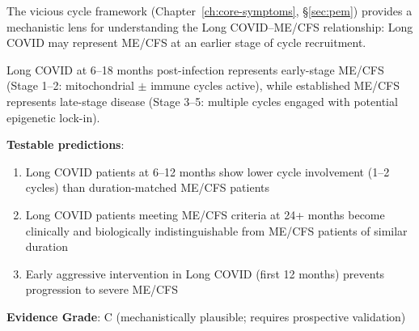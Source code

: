 The vicious cycle framework (Chapter~\ref{ch:core-symptoms}, \S\ref{sec:pem}) provides a mechanistic lens for understanding the Long COVID--ME/CFS relationship: Long COVID may represent ME/CFS at an earlier stage of cycle recruitment.

\begin{hypothesis}
Long COVID at 6--18 months post-infection represents early-stage ME/CFS (Stage 1--2: mitochondrial $\pm$ immune cycles active), while established ME/CFS represents late-stage disease (Stage 3--5: multiple cycles engaged with potential epigenetic lock-in).

\textbf{Testable predictions}:
\begin{enumerate}
    \item Long COVID patients at 6--12 months show lower cycle involvement (1--2 cycles) than duration-matched ME/CFS patients
    \item Long COVID patients meeting ME/CFS criteria at 24+ months become clinically and biologically indistinguishable from ME/CFS patients of similar duration
    \item Early aggressive intervention in Long COVID (first 12 months) prevents progression to severe ME/CFS
\end{enumerate}

\textbf{Evidence Grade}: C (mechanistically plausible; requires prospective validation)
\end{hypothesis}

